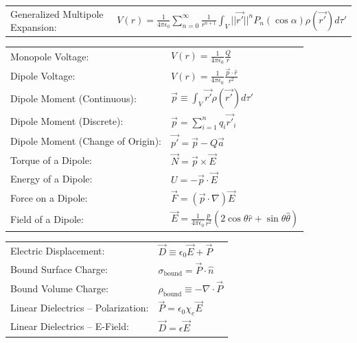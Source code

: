 \documentclass{article}
\newcommand{\kfrac}{\frac{1}{4\pi\epsilon_0}}
\newcommand{\formbox}[2]{\begin{center} \begin{tcolorbox}[colback=white, title = #1, boxrule=2pt,arc=3.4pt,boxsep=0mm] #2\end{tcolorbox}\end{center}}
\begin{document}
\begin{multicols*}{2}
{{\begin{tabular}{ m{12em} m{25em}  }
        \end{tabular}}
    }
    \formbox{Electrostatic Multipoles}{
        {\renewcommand{\arraystretch}{2}%
        \begin{tabular}{ m{8em} m{30em}  }
            Generalized Multipole Expansion: & $\displaystyle V(r) = \frac{1}{4\pi \epsilon_0}\sum_{n = 0}^\infty \frac{1}{r^{n + 1}} \int_{V} ||\vec{r'}||^n P_n(\cos \alpha)\rho(\vec{r'})d\tau'$\\
        \end{tabular}}
        \begin{tabular}{ m{15em} m{20em}  }
            Monopole Voltage: & $\displaystyle V(r) = \kfrac\frac{Q}{r}$\\
            Dipole Voltage: & $\displaystyle V(r) = \kfrac \frac{\vec{p}\cdot \hat{r}}{r^2}$\\
            Dipole Moment (Continuous): & $\displaystyle \vec{p} \equiv \int_V \vec{r'}\rho(\vec{r'})d\tau'$\\
            Dipole Moment (Discrete): & $\displaystyle \vec{p} = \sum_{i = 1}^n q_i \vec{r'}_i$\\
            Dipole Moment (Change of Origin): & $\vec{p'} = \vec{p} - Q\vec{a}$\\
            Torque of a Dipole: & $\displaystyle \vec{N} = \vec{p} \times \vec{E}$\\
            Energy of a Dipole: & $\displaystyle U = -\vec{p} \cdot \vec{E}$\\
            Force on a Dipole: & $\displaystyle \vec{F} = (\vec{p} \cdot \nabla)\vec{E}$\\
            Field of a Dipole: & $\displaystyle \vec{E} = \kfrac\frac{p}{r^2}\left(2 \cos \theta \hat{r} + \sin \theta \hat{\theta}\right)$
        \end{tabular}
    }
    \formbox{Electrostatics in Matter}{
        {\renewcommand{\arraystretch}{1.75}%
        \begin{tabular}{ m{12em} m{25em}  }
            Electric Displacement: & $\displaystyle \vec{D} \equiv \epsilon_0 \vec{E} + \vec{P}$\\
            Bound Surface Charge: & $\displaystyle \sigma_\textrm{bound} = \vec{P} \cdot \hat{n}$\\
            Bound Volume Charge: & $\displaystyle \rho_\textrm{bound} \equiv -\nabla \cdot \vec{P}$\\
            Linear Dielectrics -- Polarization: & $\displaystyle \vec{P} = \epsilon_0 \chi_e \vec{E}$\\
            Linear Dielectrics -- E-Field: & $\displaystyle \vec{D} = \epsilon \vec{E}$\\

\end{tabular}}}
\end{multicols*}
\end{document}
